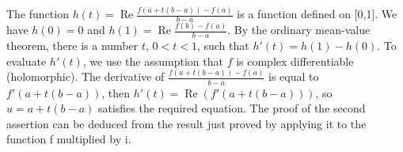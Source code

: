 \documentclass[12pt]{article}
\begin{document}
\def\Re{\operatorname{Re}}
\def\Im{\operatorname{Im}}
The function $h(t)=\Re \frac{f(a+t(b-a))-f(a)}{b-a}$ is a function defined on [0,1].
We have $h(0)=0$ and $h(1)=\Re\frac{f(b)-f(a)}{b-a}$.
By the ordinary mean-value theorem, there is a number $t$, $0<t<1$, such that $h'(t)=h(1)-h(0)$.
To evaluate $h'(t)$, we use the assumption that $f$ is complex differentiable (holomorphic). The derivative of $\frac{f(a+t(b-a))-f(a)}{b-a}$ is equal to $f'(a+t(b-a))$, then $h'(t) =\Re(f'(a+t(b-a)))$, so $u=a+t(b-a)$ satisfies the required equation.
The proof of the second assertion can be deduced from the result just proved by applying it to the function f multiplied by i.
\end{document}
